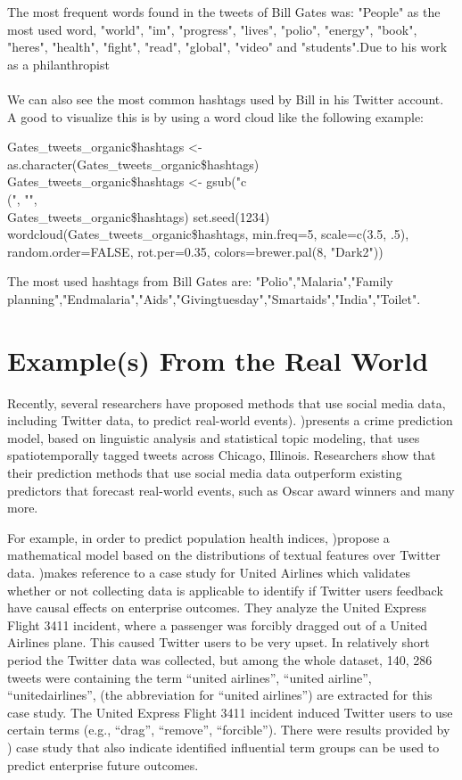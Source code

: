 The most frequent words found in the tweets of Bill Gates was: "People" as the most used word, "world", "im", "progress", "lives", "polio", "energy", "book", "heres", "health", "fight", "read", "global", "video" and "students".Due to his work as a philanthropist\\
\\
We can also see the most common hashtags used by Bill in  his Twitter account. A good to visualize this is by using a word cloud like the following example:
\begin{flushleft}
Gates\_tweets\_organic\$hashtags <- \\as.character(Gates\_tweets\_organic\$hashtags)\\
Gates\_tweets\_organic\$hashtags <- gsub("c\\(", "",\\ Gates\_tweets\_organic\$hashtags)
set.seed(1234)
wordcloud(Gates\_tweets\_organic\$hashtags, min.freq=5, scale=c(3.5, .5), random.order=FALSE, rot.per=0.35, 
colors=brewer.pal(8, "Dark2")) 
\end{flushleft}

The most used hashtags from Bill Gates are: "Polio","Malaria","Family planning","Endmalaria","Aids","Givingtuesday","Smartaids","India","Toilet".

\section{Example(s) From the Real World}\label{sec:examplerealworld}
Recently, several researchers have proposed methods that use social media data, including Twitter data, to predict real-world events\citep{LIU20153893}).
\citep{GERBER2014115})presents a crime prediction model, based on linguistic analysis and statistical topic modeling, that uses spatiotemporally tagged tweets across Chicago, Illinois. Researchers show that their prediction methods that use social media data outperform existing predictors that forecast real-world events, such as Oscar award winners and many more. 

For example, in order to predict population health indices, \citep{NGUYEN201722})propose a mathematical model based on the distributions of textual features over Twitter data.
\citep{LIM2019100007})makes reference to a case study for United Airlines which validates whether or not collecting data is applicable to identify if Twitter users feedback have causal effects on enterprise outcomes. They analyze the United Express Flight 3411 incident, where a passenger was forcibly dragged out of a United Airlines plane. This caused Twitter users to be very upset. In relatively short period the Twitter data was collected, but among the whole dataset, 140, 286 tweets were containing the term “united airlines”, “united airline”, “unitedairlines”, (the abbreviation for “united airlines”) are extracted for this case study.
The United Express Flight 3411 incident induced Twitter users to use certain terms (e.g., “drag”, “remove”, “forcible”). There were results provided by \citep{LIM2019100007}) case study that also indicate identified influential term groups can be used to predict enterprise future outcomes. 


